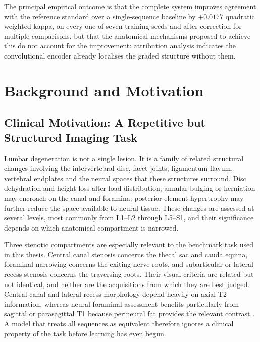 The principal empirical outcome is that the complete system improves agreement
with the reference standard over a single-sequence baseline by $+0.0177$
quadratic weighted kappa, on every one of seven training seeds and after
correction for multiple comparisons, but that the anatomical mechanisms proposed
to achieve this do not account for the improvement: attribution analysis
indicates the convolutional encoder already localises the graded structure
without them.

\section{Background and Motivation}
\label{sec:intro-background}

\subsection{Clinical Motivation: A Repetitive but Structured Imaging Task}
\label{sec:intro-clinical-motivation}

Lumbar degeneration is not a single lesion. It is a family of related structural
changes involving the intervertebral disc, facet joints, ligamentum flavum,
vertebral endplates and the neural spaces that these structures surround. Disc
dehydration and height loss alter load distribution; annular bulging or herniation
may encroach on the canal and foramina; posterior element hypertrophy may further
reduce the space available to neural tissue. These changes are assessed at several
levels, most commonly from L1--L2 through L5--S1, and their significance depends on
which anatomical compartment is narrowed.

Three stenotic compartments are especially relevant to the benchmark task used in
this thesis. Central canal stenosis concerns the thecal sac and cauda equina,
foraminal narrowing concerns the exiting nerve roots, and subarticular or lateral
recess stenosis concerns the traversing roots. Their visual criteria are related but
not identical, and neither are the acquisitions from which they are best judged.
Central canal and lateral recess morphology depend heavily on axial T2 information,
whereas neural foraminal assessment benefits particularly from sagittal or
parasagittal T1 because perineural fat provides the relevant contrast
\cite{hallinan2021deep,schizas2010qualitative,lee2010a}. A model that treats all
sequences as equivalent therefore ignores a clinical property of the task before
learning has even begun.

